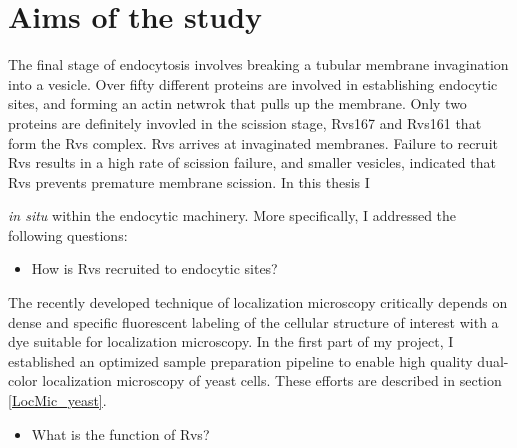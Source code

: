
\chapter{Aims of the study} %

\label{Ch:Aims} %

The final stage of endocytosis involves breaking a tubular membrane invagination into a vesicle. Over fifty different proteins are involved in establishing endocytic sites, and forming an actin netwrok that pulls up the membrane. Only two proteins are  definitely invovled in the scission stage, Rvs167 and Rvs161 that form the Rvs complex. Rvs arrives at invaginated membranes. Failure to recruit Rvs results in a high rate of scission failure, and smaller vesicles, indicated that Rvs prevents premature membrane scission. In this thesis I 

 \textit{in situ} within the endocytic machinery. More specifically, I addressed the following questions:

\begin{itemize}
	\item How is Rvs recruited to endocytic sites? 
\end{itemize}

The recently developed technique of localization microscopy critically depends on dense and specific fluorescent labeling of the cellular structure of interest with a dye suitable for localization microscopy. In the first part of my project, I established an optimized sample preparation pipeline to enable high quality dual-color localization microscopy of yeast cells. These efforts are described in section \ref{LocMic_yeast}.

\begin{itemize}
	\item What is the function of Rvs?
\end{itemize}